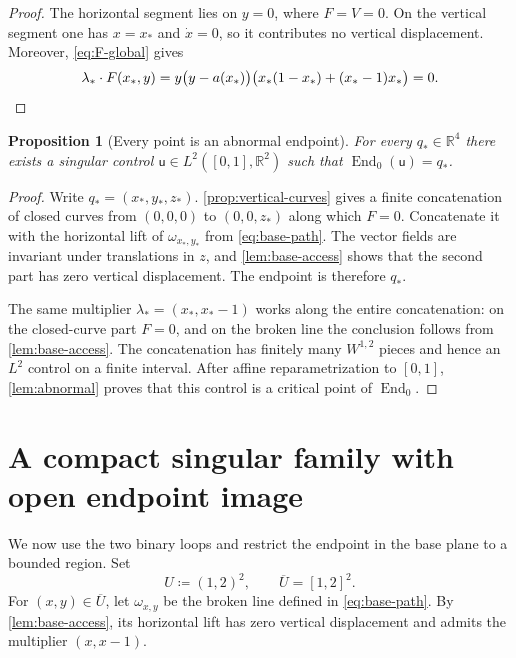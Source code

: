 \documentclass[11pt]{amsart}
\newtheorem{proposition}[theorem]{Proposition}
\numberwithin{equation}{section}
\theoremstyle{remark}
\newcommand{\R}{\mathbb R}
\newcommand{\End}{\operatorname{End}}
\begin{document}
\begin{proof}
The horizontal segment lies on $y=0$, where $F=V=0$.  On the vertical
segment one has $x=x_*$ and $\dot x=0$, so it contributes no vertical
displacement.  Moreover, \eqref{eq:F-global} gives
\begin{equation}
 \lambda_*\cdot F(x_*,y)
 =y\bigl(y-a(x_*)\bigr)
 \bigl(x_*(1-x_*)+(x_*-1)x_*\bigr)=0.\qedhere
\end{equation}
\end{proof}

\begin{proposition}[Every point is an abnormal endpoint]
\label{prop:global-abnormal}
For every $q_*\in\R^4$ there exists a singular control
$\mathsf{u}\in L^2([0,1],\R^2)$ such that $\End_0(\mathsf{u})=q_*$.  
\end{proposition}

\begin{proof}
Write $q_*=(x_*,y_*,z_*)$.  \cref{prop:vertical-curves} gives
a finite concatenation of closed curves from $(0,0,0)$ to $(0,0,z_*)$
along which $F=0$.  Concatenate it with the horizontal lift of
$\omega_{x_*,y_*}$ from \eqref{eq:base-path}.  The vector fields are invariant
under translations in $z$, and \cref{lem:base-access} shows that
the second part has zero vertical displacement.  The endpoint is
therefore $q_*$.

The same multiplier $\lambda_*=(x_*,x_*-1)$ works along the entire
concatenation: on the closed-curve part $F=0$, and on the broken line
the conclusion follows from \cref{lem:base-access}.  The
concatenation has finitely many $W^{1,2}$ pieces and hence an $L^2$
control on a finite interval.  After affine reparametrization to
$[0,1]$, \cref{lem:abnormal} proves that this control is a critical
point of $\End_0$.
\end{proof}

\section{A compact singular family with open endpoint image}

We now use the two binary loops and restrict the endpoint in the base plane
to a bounded region.  Set
\begin{equation}
 U\coloneq(1,2)^2,
 \qquad
 \overline U=[1,2]^2.
\end{equation}
For $(x,y)\in\overline U$, let $\omega_{x,y}$ be the broken line defined
in \eqref{eq:base-path}.
By \cref{lem:base-access}, its horizontal lift has zero vertical
displacement and admits the multiplier $(x,x-1)$.
\end{document}
